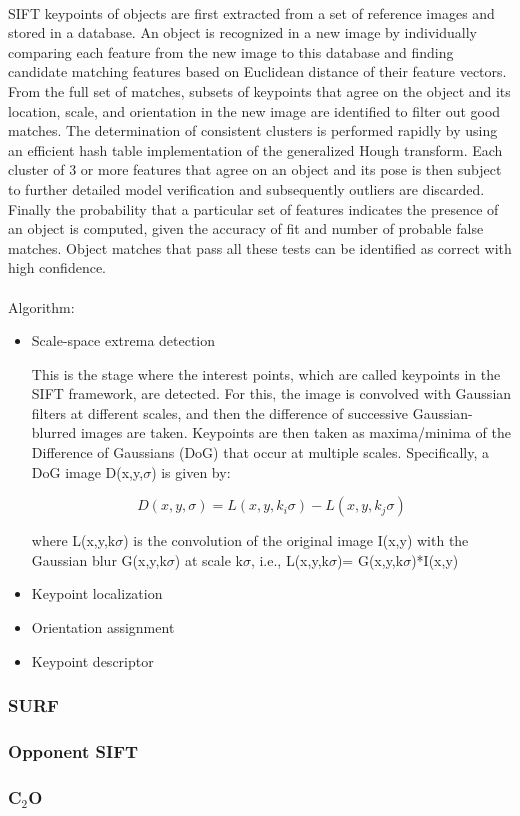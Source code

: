 \documentclass[12pt]{article}
\begin{document}
\paragraph{}
SIFT keypoints of objects are first extracted from a set of reference images and stored in a database. An object is recognized in a new image by individually comparing each feature from the new image to this database and finding candidate matching features based on Euclidean distance of their feature vectors. From the full set of matches, subsets of keypoints that agree on the object and its location, scale, and orientation in the new image are identified to filter out good matches. The determination of consistent clusters is performed rapidly by using an efficient hash table implementation of the generalized Hough transform. Each cluster of 3 or more features that agree on an object and its pose is then subject to further detailed model verification and subsequently outliers are discarded. Finally the probability that a particular set of features indicates the presence of an object is computed, given the accuracy of fit and number of probable false matches. Object matches that pass all these tests can be identified as correct with high confidence.

\paragraph{}
Algorithm:
\begin{itemize}
	\item Scale-space extrema detection
	
	
This is the stage where the interest points, which are called keypoints in the SIFT framework, are detected. For this, the image is convolved with Gaussian filters at different scales, and then the difference of successive Gaussian-blurred images are taken. Keypoints are then taken as maxima/minima of the Difference of Gaussians (DoG) that occur at multiple scales. Specifically, a DoG image D(x,y,$\sigma$) is given by:
 
\begin{equation}
D(x,y,\sigma)=L(x,y,k_i\sigma)-L(x,y,k_j\sigma)
\end{equation}

where L(x,y,k$\sigma$) is the convolution of the original image I(x,y) with the Gaussian blur G(x,y,k$\sigma$) at scale k$\sigma$, i.e., L(x,y,k$\sigma$)= G(x,y,k$\sigma$)*I(x,y)
	\item Keypoint localization
	\item Orientation assignment
	\item Keypoint descriptor
 

\end{itemize}
\subsubsection{SURF}

\subsubsection{Opponent SIFT}

\subsubsection{C$_2$O}

\end{document}
